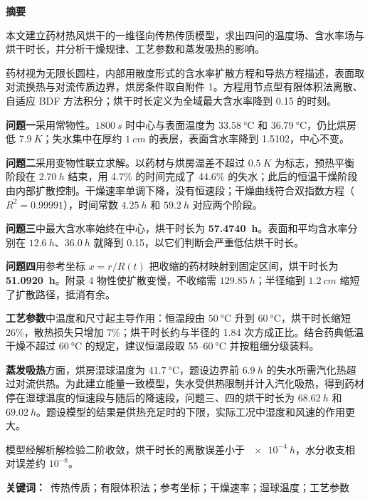 \begin{center}{\large\heiti\bfseries 摘\quad 要}\end{center}
\vspace{-4pt}

本文建立药材热风烘干的一维径向传热传质模型，求出四问的温度场、含水率场与烘干时长，并分析干燥规律、工艺参数和蒸发吸热的影响。

药材视为无限长圆柱，内部用散度形式的含水率扩散方程和导热方程描述，表面取对流换热与对流传质边界，烘房条件取自附件 1。方程用节点型有限体积法离散、自适应 BDF 方法积分；烘干时长定义为全域最大含水率降到 0.15 的时刻。

\textbf{问题一}采用常物性。$\SI{1800}{s}$ 时中心与表面温度为 $\SI{33.58}{\celsius}$ 和 $\SI{36.79}{\celsius}$，仍比烘房低 $\SI{7.9}{K}$；失水集中在厚约 $\SI{1}{cm}$ 的表层，表面含水率降到 1.5102，中心不变。

\textbf{问题二}采用变物性联立求解。以药材与烘房温差不超过 $\SI{0.5}{K}$ 为标志，预热平衡阶段在 $\SI{2.70}{h}$ 结束，用 4.7\% 的时间完成了 44.6\% 的失水；此后的恒温干燥阶段由内部扩散控制。干燥速率单调下降，没有恒速段；干燥曲线符合双指数方程（$R^2=0.99991$），时间常数 $\SI{4.25}{h}$ 和 $\SI{59.2}{h}$ 对应两个阶段。

\textbf{问题三}中最大含水率始终在中心，烘干时长为 \textbf{57.4740~h}。表面和平均含水率分别在 $\SI{12.6}{h}$、$\SI{36.0}{h}$ 就降到 0.15，以它们判断会严重低估烘干时长。

\textbf{问题四}用参考坐标 $x=r/R(t)$ 把收缩的药材映射到固定区间，烘干时长为 \textbf{51.0920~h}。附录 4 物性使扩散变慢，不收缩需 $\SI{129.85}{h}$；半径缩到 $\SI{1.2}{cm}$ 缩短了扩散路径，抵消有余。

\textbf{工艺参数}中温度和尺寸起主导作用：恒温段由 $\SI{50}{\celsius}$ 升到 $\SI{60}{\celsius}$，烘干时长缩短 26\%，散热损失只增加 7\%；烘干时长约与半径的 1.84 次方成正比。结合药典低温干燥不超过 $\SI{60}{\celsius}$ 的规定，建议恒温段取 55--$\SI{60}{\celsius}$ 并按粗细分级装料。

\textbf{蒸发吸热}方面，烘房湿球温度为 $\SI{41.7}{\celsius}$，题设边界前 $\SI{6.9}{h}$ 的失水所需汽化热超过对流供热。为此建立能量一致模型，失水受供热限制并计入汽化吸热，得到药材停在湿球温度的恒速段与随后的降速段，问题三、四的烘干时长为 $\SI{68.62}{h}$ 和 $\SI{69.02}{h}$。题设模型的结果是供热充足时的下限，实际工况中湿度和风速的作用更大。

模型经解析解检验二阶收敛，烘干时长的离散误差小于 $\SI{e-4}{h}$，水分收支相对误差约 $10^{-8}$。

\vspace{2pt}
\noindent\textbf{关键词：}\ 传热传质；有限体积法；参考坐标；干燥速率；湿球温度；工艺参数
